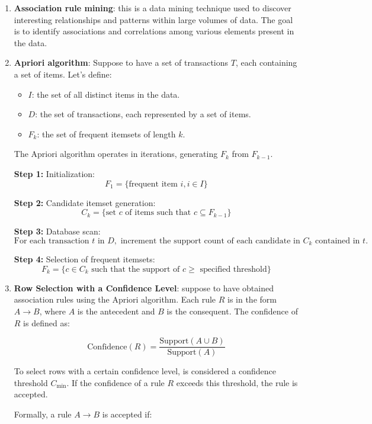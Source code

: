 \documentclass[12pt,a4paper,openright,twoside]{book}
\begin{document}
\begin{enumerate}
    \item \textbf{Association rule mining}: this is a data mining technique used to discover interesting relationships and patterns within large volumes of data. The goal is to identify associations and correlations among various elements present in the data.

    \item \textbf{Apriori algorithm}: Suppose to have a set of transactions $T$, each containing a set of items. Let's define:

\begin{itemize}
  \item $I$: the set of all distinct items in the data.
  \item $D$: the set of transactions, each represented by a set of items.
  \item $F_k$: the set of frequent itemsets of length $k$.
\end{itemize}

The Apriori algorithm operates in iterations, generating $F_k$ from $F_{k-1}$.

\textbf{Step 1:} Initialization:
$$F_1 = \{ \text{frequent item } i, i \in I \}$$

\textbf{Step 2:} Candidate itemset generation:
$$C_k = \{ \text{set } c \text{ of items such that } c \subseteq F_{k-1} \}$$

\textbf{Step 3:} Database scan:
$$\text{For each transaction } t \text{ in } D, \text{ increment the support count of each candidate in } C_k \text{ contained in } t.$$

\textbf{Step 4:} Selection of frequent itemsets:
$$F_k = \{ c \in C_k \text{ such that the support of } c \geq \text{ specified threshold} \}$$

\item \textbf{Row Selection with a Confidence Level}: 
suppose to have obtained association rules using the Apriori algorithm. Each rule $R$ is in the form $A \rightarrow B$, where $A$ is the antecedent and $B$ is the consequent. The confidence of $R$ is defined as:

\[
\text{Confidence}(R) = \frac{\text{Support}(A \cup B)}{\text{Support}(A)}
\]

To select rows with a certain confidence level, is considered a confidence threshold $C_{\text{min}}$. If the confidence of a rule $R$ exceeds this threshold, the rule is accepted.

Formally, a rule $A \rightarrow B$ is accepted if:


\end{enumerate}
\end{document}
